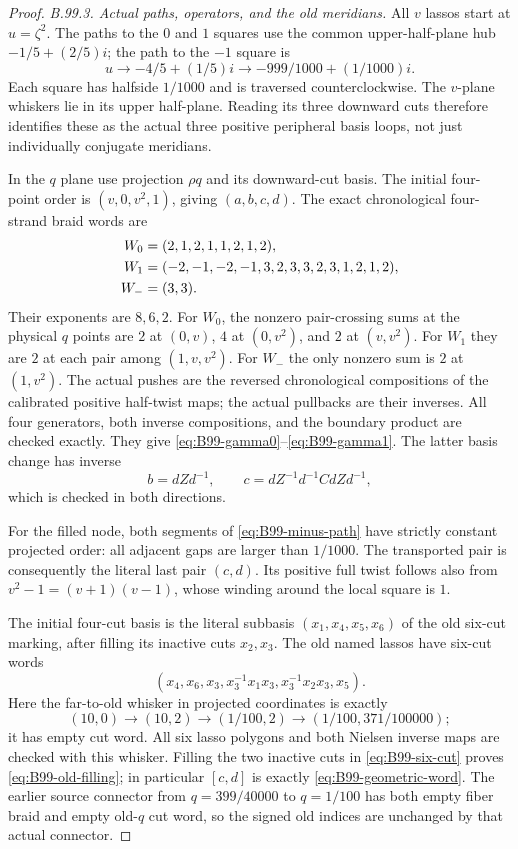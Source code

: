 \begin{proof}
\emph{B.99.3. Actual paths, operators, and the old meridians.}
All $v$ lassos start at $u=\zeta^2$.
The paths to the $0$ and $1$ squares use the common upper-half-plane
hub $-1/5+(2/5)i$; the path to the $-1$ square is
\begin{equation}\label{eq:B99-minus-path}
 u\longrightarrow-4/5+(1/5)i
   \longrightarrow-999/1000+(1/1000)i.
\end{equation}
Each square has halfside $1/1000$ and is traversed counterclockwise.
The $v$-plane whiskers lie in its upper half-plane.
Reading its three downward cuts therefore identifies these as the
actual three positive peripheral basis loops, not just individually
conjugate meridians.

In the $q$ plane use projection $\rho q$ and its downward-cut basis.
The initial four-point order is $(v,0,v^2,1)$, giving $(a,b,c,d)$.
The exact chronological four-strand braid words are
\begin{align}
 W_0&=(2,1,2,1,1,2,1,2),\notag\\
 W_1&=(-2,-1,-2,-1,3,2,3,3,2,3,1,2,1,2),\notag\\
 W_-&=(3,3).
 \label{eq:B99-braids}
\end{align}
Their exponents are $8,6,2$.
For $W_0$, the nonzero pair-crossing sums at the physical
$q$ points are $2$ at $(0,v)$, $4$ at $(0,v^2)$, and $2$ at $(v,v^2)$.
For $W_1$ they are $2$ at each pair among $(1,v,v^2)$.
For $W_-$ the only nonzero sum is $2$ at $(1,v^2)$.
The actual pushes are the reversed chronological compositions of
the calibrated positive half-twist maps; the actual pullbacks are
their inverses.
All four generators, both inverse compositions, and the boundary
product are checked exactly.
They give \eqref{eq:B99-gamma0}--\eqref{eq:B99-gamma1}.
The latter basis change has inverse
\[
 b=dZd^{-1},\qquad c=dZ^{-1}d^{-1}CdZd^{-1},
\]
which is checked in both directions.

For the filled node, both segments of \eqref{eq:B99-minus-path}
have strictly constant projected order: all adjacent gaps are
larger than $1/1000$.
The transported pair is consequently the literal last pair $(c,d)$.
Its positive full twist follows also from
$v^2-1=(v+1)(v-1)$, whose winding around the local square is $1$.

The initial four-cut basis is the literal subbasis $(x_1,x_4,x_5,x_6)$
of the old six-cut marking, after filling its inactive cuts $x_2,x_3$.
The old named lassos have six-cut words
\begin{equation}\label{eq:B99-six-cut}
 (x_4,x_6,x_3,x_3^{-1}x_1x_3,x_3^{-1}x_2x_3,x_5).
\end{equation}
Here the far-to-old whisker in projected coordinates is exactly
\[
 (10,0)\to(10,2)\to(1/100,2)\to(1/100,371/100000);
\]
it has empty cut word.
All six lasso polygons and both Nielsen inverse maps are checked
with this whisker.
Filling the two inactive cuts in \eqref{eq:B99-six-cut} proves
\eqref{eq:B99-old-filling}; in particular $[c,d]$ is exactly
\eqref{eq:B99-geometric-word}.
The earlier source connector from $q=399/40000$ to $q=1/100$
has both empty fiber braid and empty old-$q$ cut word, so the
signed old indices are unchanged by that actual connector.


\end{proof}
